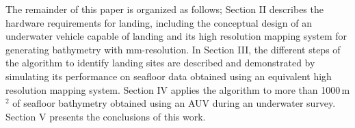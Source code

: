 The remainder of this paper is organized as follows; Section II describes the hardware requirements for landing, including the conceptual design of an underwater vehicle capable of landing and its high resolution mapping system for generating bathymetry with mm-resolution. In  Section III, the different steps of the algorithm to identify landing sites are described and demonstrated by simulating its performance on seafloor data obtained using an equivalent high resolution mapping system.  Section IV applies the algorithm to more than 1000\,m$^2$ of seafloor bathymetry obtained using an AUV during an underwater survey. Section V presents the conclusions of this work. 

